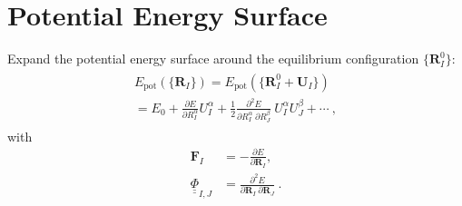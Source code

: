 \documentclass[nofootinbib,preprintnumbers,amsmath,amssymb,twocolumn]{revtex4-1}
\renewcommand{\b}[1]{\boldsymbol{#1}}
\renewcommand{\t}[1]{\text{#1}}
\newcommand{\nid}{\noindent}
\newcommand{\halb}{\frac{1}{2}}
\newcommand{\uunderline}[1]{\underline{\underline{{#1}}}}
\begin{document}
\section{Potential Energy Surface}
\nid
Expand the potential energy surface around the equilibrium configuration
$\{ \b R_I^0 \}$:
\begin{align}
\begin{split}
	E_\t{pot}( \{ \b R_I \}) = E_\t{pot}( \{ \b R_I^0 + \b U_I \}) \\
	= E_0 + \frac{\partial E}{\partial R_I^\alpha} U_I^\alpha
	+ \halb \frac{\partial^2 E}{\partial R_I^\alpha~\partial R_J^\beta} 
	~ U_I^\alpha U_J^\beta
	+ \cdots~,
\end{split}
\end{align}
with
\begin{align}
	\b F_I &= - \frac{\partial E}{\partial \b R_I}, \\
	\uunderline{\Phi}_{I,J}	&= \frac{\partial^2 E}{\partial \b R_I ~ \partial \b R_J}~.
\end{align}

\cleardoublepage






\end{document}
